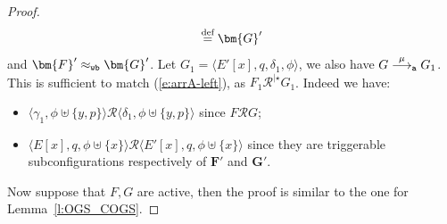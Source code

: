 \documentclass[11pt,a4paper]{amsart}
\theoremstyle{plain}
\theoremstyle{definition}
\theoremstyle{defC}
\theoremstyle{thmC}
\theoremstyle{plain}
\numberwithin{equation}{section}
\newcommand{\stt}{\sigma}
\newcommand{\uptoComp}[1]{\mathrel{#1^{|\star}}}
\newcommand{\Ep}{E'}              %
\newcommand{\rmm}[1]{{\tt{\lowercase{#1}}}}
\newcommand{\genarr}[2]{\mathrel{\stackrel{{#1}}{\longrightarrow}_{\rmm{\lowercase{#2}}}}}
\newcommand{\genArr}[2]{\mathrel{\stackrel{{#1}}{\Longrightarrow}_{\rmm{\lowercase{#2}}}}}  %
\newcommand{\arrA}[1]{\genarr{#1}{A}}  %
\newcommand{\ArrA}[1]{\genArr{#1}{A}}  %
\newcommand{\arrWB}[1]{\genarr{#1}{WB}}           %
\newcommand{\genwb}[1]{\mathrel{\approx_{\rmm{\lowercase{#1}}}}}       %
\newcommand{\wbWB}{\genwb{wb}}       %
\def\R{{\mathcal R}}
\def\RR{\mathrel{\mathcal R}}
\def\defi{\stackrel{\mbox{\scriptsize {\rm{def}}}}{=}} %
\newcommand{\FF}{F}
\newcommand{\GG}{G}
\newcommand{\FFb}{{\bm{\FF}}} %
\newcommand{\GGb}{{\bm{\GG}}} %
\newcommand{\reff}[1]{(\ref{#1})}
\newcommand{\dom}[1]{\mathrm{dom}(#1)}
\newcommand{\emptymap}{\varepsilon}
\newcommand{\pmap}[2]{[#1 \mapsto #2]}
\newcommand{\act}{\mu}
\newcommand{\questPV}[3]{\bar{#1}(#2,#3)}
\newcommand{\conf}[1]{\langle #1\rangle}
\theoremstyle{plain}
\theoremstyle{definition}
\begin{document}
\begin{proof}
\[  \defi \GGb'\]
  and $\FFb' \wbWB \GGb'$.
  Let $\GG_1 = \conf{\Ep[x],q,\delta_1,\phi}$,
  we also have 
  $\GG \arrA \act \GG_1$.
  This is sufficient to match \reff{e:arrA-left}, as 
  $\FF_1 \uptoComp \R  \GG_1$. Indeed we have:
  \begin{itemize}  
  \item $\conf{\gamma_1,\phi\uplus \{y,p\}} \R  \conf{\delta_1,\phi\uplus \{y,p\}}$
  since $\FF \RR \GG$;
  \item  $\conf{E[x],q, \phi\uplus \{x\}} \R  \conf{\Ep[x],q, \phi\uplus \{x\}}$
  since they are triggerable subconfigurations respectively of $\FFb'$ and $\GGb'$.
  \end{itemize}
\noindent
  Now suppose that $\FF,\GG$ are active,
  then the proof is similar to the one for Lemma~\ref{l:OGS_COGS}. \qedhere
  

\end{proof}
\end{document}
